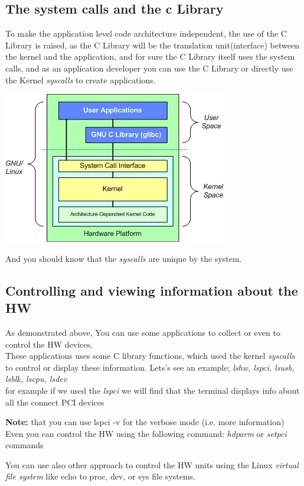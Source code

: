 \documentclass{article}
\begin{document}
\subsection{The system calls and the c Library}
To make the application level code architecture independent, the use of the C Library is raised, as the C Library will be the translation unit(interface) between the kernel and the application, and for sure the C Library itself uses the system calls, and as an application developer you can use the C Library or directly use the Kernel \textit{syscalls} to create applications.

\begin{center}
\includegraphics[scale=0.75]{resources/img/libclang-linux}
\end{center}
And you should know that the \textit{syscalls} are unique by the system.

\subsection{Controlling and viewing information about the HW}
As demonstrated above, You can use some applications to collect or even to control the HW devices.\\
These applications uses some C library functions, which used the kernel \textit{syscalls} to control or display these information.
Lets's see an example; \textit{lshw, lspci, lsusb, lsblk, lscpu, lsdev}\\
for example if we used the \textit{lspci} we will find that the terminal displays info about all the connect PCI devices 



\textbf{Note:} that you can use lspci -v for the verbose mode (i.e. more information)\\

Even you can control the HW using the following command: \textit{hdparm} or \textit{setpci} commands

You can use also other approach to control the HW units using the Linux \textit{virtual file system}
like echo to proc, dev, or sys file systems.
\end{document}
